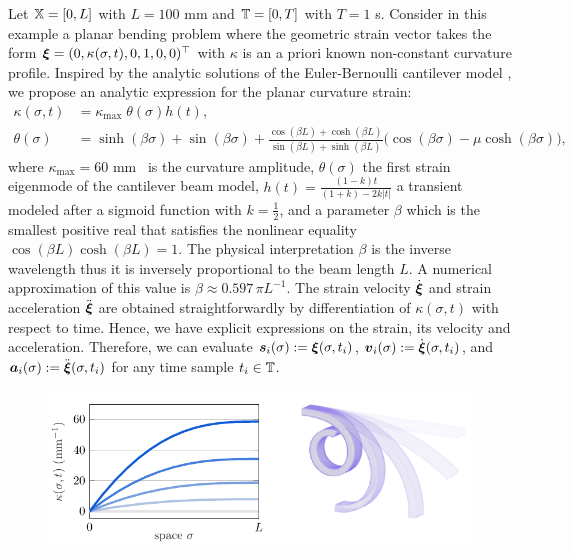 \begin{example}
Let $\mathbb{X} = [0,L]$ with $L = 100$ \si{\milli \meter} and $\mathbb{T} = [0, T]$ with $T = 1$ \si{\second}. Consider in this example a planar bending problem where the geometric strain vector takes the form ${\boldsymbol{\xi}} = (0,\kappa(\sigma,t),0,1,0,0)^\top$ with $\kappa$ is an a priori known non-constant curvature profile. Inspired by the analytic solutions of the Euler-Bernoulli cantilever model \cite{Holzapfel2002}, we propose an analytic expression for the planar curvature strain:
%
\begin{align}
\kappa(\sigma,t) & =  \kappa_{\textrm{max}} \; \theta(\sigma) h(t), \\
\theta(\sigma) & =  \sinh(\beta \sigma) + \sin(\beta \sigma) + \frac{\cos(\beta L)+\cosh(\beta L)}{\sin(\beta L)+ \sinh(\beta L)} \big(\cos(\beta \sigma)-\mu \cosh(\beta \sigma) \big), 
\end{align}  
%
where $\kappa_{\textrm{max}} = 60$ \si{\milli \meter \inv} is the curvature amplitude, $\theta(\sigma)$ the first strain eigenmode of the cantilever beam model, $h(t) = \frac{(1- k)t}{(1 + k) - 2k|t|}$ a transient modeled after a sigmoid function with $k = \frac{1}{2}$, and a parameter $\beta$ which is the smallest positive real that satisfies the nonlinear equality $\cos(\beta L)\cosh(\beta L) = 1$. The physical interpretation $\beta$ is the inverse wavelength thus it is inversely proportional to the beam length $L$. A numerical approximation of this value is $\beta \approx 0.597 \, \pi L^{-1}$. The strain velocity $\dot{{\boldsymbol{\xi}}}$ and strain acceleration $\ddot{{\boldsymbol{\xi}}}$ are obtained  straightforwardly by differentiation of $\kappa(\sigma,t)$ with respect to time. Hence, we have explicit expressions on the strain, its velocity and acceleration. Therefore, we can evaluate ${\boldsymbol{s}}_i(\sigma) := {\boldsymbol{\xi}}(\sigma,t_i)$, ${\boldsymbol{v}}_i(\sigma) := \dot{{\boldsymbol{\xi}}}(\sigma,t_i)$, and ${\boldsymbol{a}}_i(\sigma) := \ddot{{\boldsymbol{\xi}}}(\sigma,t_i)$ for any time sample $t_i \in \mathbb{T}$.
%
\begin{figure}[!t]
  \centering
  \vspace{-5mm}
  \includegraphics{./pdf/thesis-figure-5-2-1.pdf}  \\[0.15em]

\end{figure}
\end{example}
